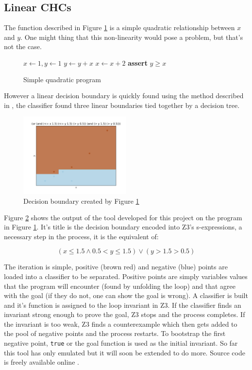 \documentclass[letterpaper,twocolumn,10pt]{article}
\begin{document}
\subsection{Linear CHCs}

The function described in Figure \ref{fig:quadratic} is a simple quadratic
relationship between $x$ and  $y$. One might thing that this non-linearity
would pose a problem, but that's not the case.

\begin{figure}[h]
\begin{algorithmic}
\State $x \gets 1, y \gets 1$
\Loop
  \State $y \gets y + x$
  \State $x \gets x + 2$
\State \textbf{assert} $y \geq x$
\EndLoop
\EndFunction
\end{algorithmic}
\caption{Simple quadratic program}
\label{fig:quadratic}
\end{figure}

However a linear decision boundary is quickly found using the method described
in \cite{data-driven}, the classifier found three linear boundaries tied
together by a decision tree.

\begin{figure}[h]
  \includegraphics[width=0.5\textwidth]{quadratic}
  \caption{Decision boundary created by Figure \ref{fig:quadratic}}
  \label{fig:quadratic-graph}
\end{figure}

Figure \ref{fig:quadratic-graph} shows the output
of the tool developed for this project on the program in Figure
\ref{fig:quadratic}. It's title is the decision boundary encoded into Z3's
s-expressions, a necessary step in the process, it is the equivalent of:

$$
(x \leq 1.5 \land 0.5 < y \leq 1.5) \lor (y > 1.5 > 0.5)
$$

The iteration is simple, positive (brown red) and negative (blue) points are
loaded into a classifier to be separated. Positive points are simply variables
values that the program will encounter (found by unfolding the loop) and that
agree with the goal (if they do not, one can show the goal is wrong).
A classifier is built and it's function is assigned to the loop invariant in Z3.
If the classifier finds an invariant strong enough to prove the goal, Z3 stops
and the process completes. If the invariant is too weak, Z3 finds a
counterexample which then gets added to the pool of negative points and the
process restarts. To bootstrap the first negative point,
\texttt{true} or the goal function is used as the initial invariant.
So far this tool has only emulated \cite{data-driven} but it will soon be
extended  to do more. Source code is freely available online \cite{github}.
\end{document}
